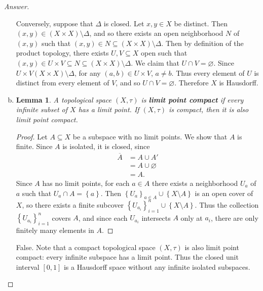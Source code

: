 \documentclass[12pt]{article}
\newcommand\setb[1]{\left \{ #1 \right \}}
\newtheorem{lemma}[theorem]{Lemma}
\theoremstyle{definition}
\begin{document}
\begin{proof}[Answer]
\begin{enumerate}[(a)]
        Conversely, suppose that $\Delta$ is closed. Let $x , y \in X$ be distinct. Then $(x,y) \in (X \times X) \setminus \Delta$, and so there exists an open neighborhood $N$ of $(x,y)$ such that $(x,y) \in N \subseteq (X \times X) \setminus \Delta$. Then by definition of the product topology, there exists $U , V \subseteq X$ open such that $(x,y) \in U \times V \subseteq N \subseteq (X \times X) \setminus \Delta$. We claim that $U \cap V = \varnothing$. Since $U \times V (X \times X) \setminus \Delta$, for any $(a,b) \in U \times V$, $a \neq b$. Thus every element of $U$ is distinct from every element of $V$, and so $U \cap V = \varnothing$. Therefore $X$ is Hausdorff.
        \item 
        \begin{lemma}
            A topological space $(X,\tau)$ is \textbf{limit point compact} if every infinite subset of $X$ has a limit point. If $(X,\tau)$ is compact, then it is also limit point compact.
        \end{lemma}
        \begin{proof}
            Let $A \subseteq X$ be a subspace with no limit points. We show that $A$ is finite. Since $A$ is isolated, it is closed, since
            \begin{align*}
                \overline{A} & = A \cup A' \\
                & = A \cup \varnothing \\
                & = A.
            \end{align*}
            Since $A$ has no limit points, for each $a \in A$ there exists a neighborhood $U_a$ of $a$ such that $U_a \cap A = \setb{ a }$. Then $\setb{ U_a }_{a \in A} \cup \setb{ X \setminus A }$ is an open cover of $X$, so there exists a finite subcover $\setb{ U_{a_i} }_{i = 1}^n \cup \setb{ X \setminus A }$. Thus the collection $\setb{ U_{a_i} }_{i = 1}^n$ covers $A$, and since each $U_{a_i}$ intersects $A$ only at $a_i$, there are only finitely many elements in $A$.
        \end{proof}
        False. Note that a compact topological space $(X,\tau)$ is also limit point compact: every infinite subspace has a limit point. Thus the closed unit interval $[0,1]$ is a Hausdorff space without any infinite isolated subspaces.
    \end{enumerate}
\end{proof}
\end{document}

